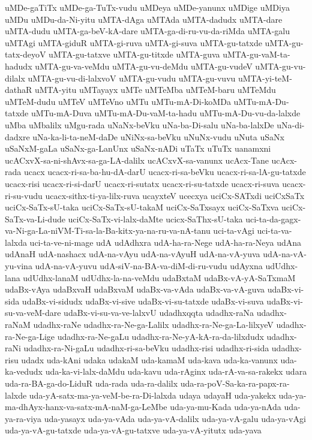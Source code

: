 {uMDe-gaTiTx
uMDe-ga-TuTx-vudu
uMDeya
uMDe-yanunx
uMDige
uMDiya
uMDu
uMDu-da-Ni-yitu
uMTA-dAga
uMTAda
uMTA-dadudx
uMTA-dare
uMTA-dudu
uMTA-ga-beV-kA-dare
uMTA-ga-di-ru-vu-da-riMda
uMTA-galu
uMTAgi
uMTA-giduR
uMTA-gi-ruva
uMTA-gi-suva
uMTA-gu-tatxde
uMTA-gu-tatx-deyoV
uMTA-gu-tatxve
uMTA-gu-titxde
uMTA-guva
uMTA-gu-vaM-ta-hadudx
uMTA-gu-va-veMdu
uMTA-gu-vu-deMdu
uMTA-gu-vudeV
uMTA-gu-vu-dilalx
uMTA-gu-vu-di-lalxvoV
uMTA-gu-vudu
uMTA-gu-vuvu
uMTA-yi-teM-dathaR
uMTA-yitu
uMTayayx
uMTe
uMTeMba
uMTeM-baru
uMTeMdu
uMTeM-dudu
uMTeV
uMTeVno
uMTu
uMTu-mA-Di-koMDa
uMTu-mA-Du-tatxde
uMTu-mA-Duva
uMTu-mA-Du-vaM-ta-hadu
uMTu-mA-Du-vu-da-lalxde
uMba
uMbalilx
uMgu-rada
uNaNx-beVku
uNa-ba-Di-salu
uNa-ba-lalxDe
uNa-di-dadxre
uNa-ka-li-ta-neM-daDe
uNiNx-sa-beVku
uNuNx-vudu
uNuta
uSaNx
uSaNxM-gaLa
uSaNx-ga-LanUnx
uSaNx-nADi
uTaTx
uTuTx
uanamxni
ucACxvX-sa-ni-shAvx-sa-ga-LA-dalilx
ucACxvX-sa-vanunx
ucAcx-Tane
ucAcx-rada
ucacx
ucacx-ri-sa-ba-hu-dA-darU
ucacx-ri-sa-beVku
ucacx-ri-sa-lA-gu-tatxde
ucacx-risi
ucacx-ri-si-darU
ucacx-ri-sutatx
ucacx-ri-su-tatxde
ucacx-ri-suva
ucacx-ri-su-vudu
ucacx-sithx-ti-ya-lilx-ruva
ucayxteV
ucecxya
uciCx-SATxdi
uciCxSaTx
uciCx-SaTx-sU-taka
uciCx-SaTx-sU-takaM
uciCx-SaTxsayx
uciCx-SaTxva
uciCx-SaTx-va-Li-dude
uciCx-SaTx-vi-lalx-daMte
ucicx-SaThx-sU-taka
uci-ta-da-gagx-va-Ni-ga-La-niVM-Ti-sa-la-Ba-kitx-ya-na-ru-va-nA-tanu
uci-ta-vAgi
uci-ta-va-lalxda
uci-ta-ve-ni-mage
udA
udAdhxra
udA-ha-ra-Nege
udA-ha-ra-Neya
udAna
udAnaH
udA-nashacx
udA-na-vAyu
udA-na-vAyuH
udA-na-vA-yuva
udA-na-vA-yu-vina
udA-na-vA-yuvu
udA-siV-na-BA-va-diM-di-ru-vudu
udAyxna
udUdhx-lana
udUdhx-lanaM
udUdhx-la-na-veMdu
udaBxtaM
udaBx-vA-yA-SaTxmaM
udaBx-vAya
udaBxvaH
udaBxvaM
udaBx-va-vAda
udaBx-va-vA-guva
udaBx-vi-sida
udaBx-vi-sidudx
udaBx-vi-sive
udaBx-vi-su-tatxde
udaBx-vi-suva
udaBx-vi-su-va-veM-dare
udaBx-vi-su-va-ve-lalxvU
udadhxqqta
udadhx-raNa
udadhx-raNaM
udadhx-raNe
udadhx-ra-Ne-ga-Lalilx
udadhx-ra-Ne-ga-La-lilxyeV
udadhx-ra-Ne-ga-Lige
udadhx-ra-Ne-gaLu
udadhx-ra-Ne-yA-kA-ra-da-lilxdudx
udadhx-raNi
udadhx-ra-Ni-gaLu
udadhx-ri-sa-beVku
udadhx-risi
udadhx-ri-sida
udadhx-risu
udadx
uda-kAni
udaka
udakaM
uda-kamaM
uda-kava
uda-ka-vanunx
uda-ka-vedudx
uda-ka-vi-lalx-daMdu
uda-kavu
uda-rAginx
uda-rA-va-sa-rakekx
udara
uda-ra-BA-ga-do-LiduR
uda-rada
uda-ra-dalilx
uda-ra-poV-Sa-ka-ra-papx-ra-lalxde
uda-yA-satx-ma-ya-veM-be-ra-Di-lalxda
udaya
udayaH
uda-yakekx
uda-ya-ma-dhAyx-hanx-va-satx-mA-naM-ga-LeMbe
uda-ya-mu-Kada
uda-ya-nAda
uda-ya-ra-viya
uda-yasayx
uda-ya-vAda
uda-ya-vA-dalilx
uda-ya-vA-galu
uda-ya-vAgi
uda-ya-vA-gu-tatxde
uda-ya-vA-gu-tatxve
uda-ya-vA-yitutx
uda-yava
}
